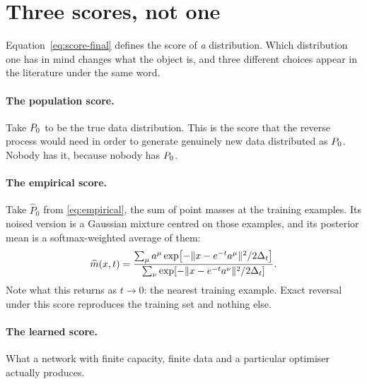 \section{Three scores, not one}
\label{sec:memorisation}

Equation~\eqref{eq:score-final} defines the score of \emph{a} distribution. Which
distribution one has in mind changes what the object is, and three different choices appear in
the literature under the same word.

\paragraph{The population score.} Take $P_0$ to be the true data distribution. This is the
score that the reverse process would need in order to generate genuinely new data
distributed as $P_0$. Nobody has it, because nobody has $P_0$.

\paragraph{The empirical score.} Take $\widehat{P}_0$ from \eqref{eq:empirical}, the sum of
point masses at the training examples. Its noised version is a Gaussian mixture centred on
those examples, and its posterior mean is a softmax-weighted average of them:
\begin{equation}
\label{eq:empirical-mean}
\widehat{m}(x,t)
= \frac{\sum_{\mu} a^\mu \exp\!\left[-\|x-e^{-t}a^\mu\|^2/2\Delta_t\right]}
       {\sum_{\nu} \exp\!\left[-\|x-e^{-t}a^\nu\|^2/2\Delta_t\right]} .
\end{equation}
Note what this returns as $t\to0$: the nearest training example. Exact reversal under this
score reproduces the training set and nothing else.

\paragraph{The learned score.} What a network with finite capacity, finite data and a
particular optimiser actually produces.


